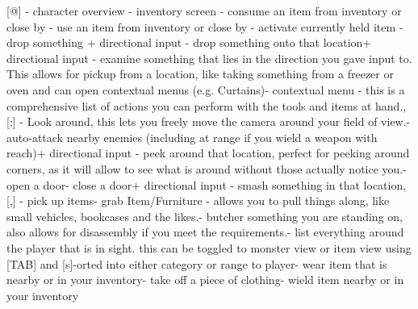 \documentclass[11pt]{report}
\begin{document}
[@] - character overview \newline
[i] - inventory screen \newline
[E] - consume an item from inventory or close by \newline
[a] - use an item from inventory or close by \newline
[A] - activate currently held item \newline
[d] - drop something \newline
[D] + directional input - drop something onto that location\newline
[e] + directional input - examine something that lies in the direction you gave input to. This allows for pickup from a location, like taking something from a freezer or oven and can open contextual menus (e.g. Curtains)\newline
[\%] - contextual menu - this is a comprehensive list of actions you can perform with the tools and items at hand.\newline
[x], [;] - Look around, this lets you freely move the camera around your field of view.\newline
[TAB] - auto-attack nearby enemies (including at range if you wield a weapon with reach)\newline
[X] + directional input - peek around that location, perfect for peeking around corners, as it will allow to see what is around without those actually notice you.\newline
[o] - open a door\newline
[c] - close a door\newline
[s] + directional input - smash something in that location\newline
[g], [,] - pick up items\newline
[G] - grab Item/Furniture - allows you to pull things along, like small vehicles, bookcases and the likes.\newline
[B] - butcher something you are standing on, also allows for disassembly if you meet the requirements.\newline
[V] - list everything around the player that is in sight. this can be toggled to monster view or item view using [TAB] and [s]-orted into either category or range to player\newline
[W] - wear item that is nearby or in your inventory\newline
[T] - take off a piece of clothing\newline
[w] - wield item nearby or in your inventory\newline
\end{document}
